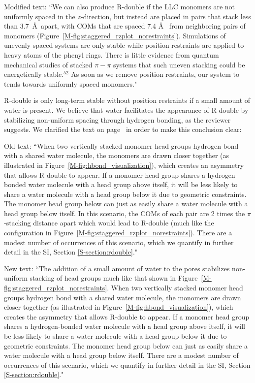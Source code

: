 \documentclass{article}
\begin{document}
\begin{enumerate}
    Modified text: ``We can also produce R-double if the LLC monomers are not
    uniformly spaced in the $z$-direction, but instead are placed in pairs that
    stack less than 3.7~\AA~apart, with COMs that are spaced 7.4 \AA~ from
    neighboring pairs of monomers (Figure~\ref{M-fig:staggered_rzplot_norestraints}).
    Simulations of unevenly spaced systems are only stable while position
    restraints are applied to heavy atoms of the phenyl rings. There is little
    evidence from quantum mechanical studies of stacked $\pi-\pi$ systems that such
    uneven stacking could be energetically stable.$^{52}$ As soon %
    as we remove position restraints, our system to tends towards uniformly spaced
    monomers."

    R-double is only long-term stable without position restraints if a small
    amount of water is present. We believe that water facilitates the appearance
    of R-double by stabilizing non-uniform spacing through hydrogen bonding, as the
    reviewer suggests. We clarified the text on page~\pageref{M-modification:rdouble2}
    in order to make this conclusion clear:

    Old text: ``When two vertically stacked monomer head groups hydrogen bond
    with a shared water molecule, the monomers are drawn closer together (as
    illustrated in Figure~\ref{M-fig:hbond_visualization}), which creates an
    asymmetry that allows R-double to appear. If a monomer head group shares a
    hydrogen-bonded water molecule with a head group above itself, it will be less
    likely to share a water molecule with a head group below it due to geometric
    constraints. The monomer head group below can just as easily share a water
    molecule with a head group below itself. In this scenario, the COMs of each
    pair are 2 times the $\pi$-stacking distance apart which would lead to R-double
    (much like the configuration in
     Figure~\ref{M-fig:staggered_rzplot_norestraints}). There are a modest number of
    occurrences of this scenario, which we quantify in further detail in the SI,
    Section \ref{S-section:rdouble}."

    New text: ``The addition of a small amount of water to the pores stabilizes
    non-uniform stacking of head groups much like that shown in
    Figure~\ref{M-fig:staggered_rzplot_norestraints}. When two vertically stacked
    monomer head groups hydrogen bond with a shared water molecule, the monomers
    are drawn closer together (as illustrated in
    Figure~\ref{M-fig:hbond_visualization}), which creates the asymmetry that allows
    R-double to appear. If a monomer head group shares a hydrogen-bonded water
    molecule with a head group above itself, it will be less likely to share a
    water molecule with a head group below it due to geometric constraints. The
    monomer head group below can just as easily share a water molecule with a head
    group below itself. There are a modest number of occurrences of this scenario,
    which we quantify in further detail in the SI, Section
    \ref{S-section:rdouble}."


\end{enumerate}
\end{document}

